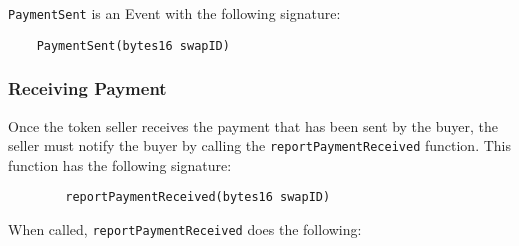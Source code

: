 \documentclass[11pt]{article}
\begin{document}
    \verb|PaymentSent| is an Event with the following signature:
    \begin{verbatim}
    PaymentSent(bytes16 swapID)
    \end{verbatim}

    \subsubsection*{Receiving Payment}

    Once the token seller receives the payment that has been sent by the buyer, the seller must notify the buyer by calling the \verb|reportPaymentReceived| function.
    This function has the following signature:
    \begin{verbatim}
        reportPaymentReceived(bytes16 swapID)
    \end{verbatim}

    When called, \verb|reportPaymentReceived| does the following:
\end{document}
